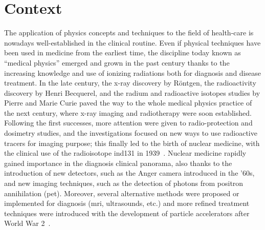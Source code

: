 \chapter{Context}\label{chap::1}

\vfill

\minitoc

\newpage

\glsresetall

The application of physics concepts and techniques to the field of health-care is nowadays well-established in the clinical routine. Even if physical techniques have been used in medicine from the earliest time\parencite{Duck2014}, the discipline today known as \enquote{medical physics} emerged and grown in the past century thanks to the increasing knowledge and use of ionizing radiations both for diagnosis and disease treatment. In the late  century, the x-ray discovery by R\"{o}ntgen, the radioactivity discovery by Henri Becquerel, and the radium and radioactive isotopes studies by Pierre and Marie Curie paved the way to the whole medical physics practice of the next century, where x-ray imaging and radiotherapy were soon established. Following the first successes, more attention were given to radio-protection and dosimetry studies, and the investigations focused on new ways to use radioactive tracers for imaging purpose; this finally led to the birth of nuclear medicine, with the clinical use of the radioisotope \gls{ind131} in 1939~\parencite{Kereiakes1987}. Nuclear medicine rapidly gained importance in the diagnosis clinical panorama, also thanks to the introduction of new detectors, such as the Anger camera introduced in the '60s, and new imaging techniques, such as the detection of photons from positron annihilation (\gls{pet}). Moreover, several alternative methods were proposed or implemented for diagnosis (\gls{mri}, ultrasounds, etc.) and more refined treatment techniques were introduced with the development of particle accelerators after World War 2~\parencite{Keevil2012}.  


